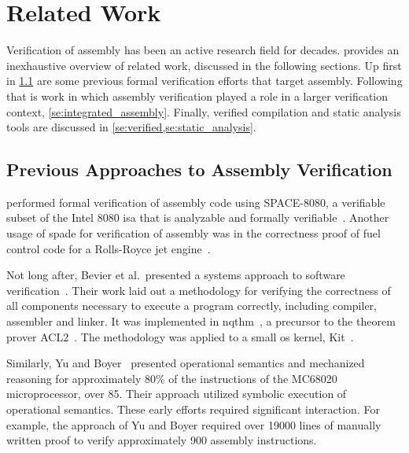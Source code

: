 \chapter{Related Work}

Verification of assembly has been an active research field for decades.
 provides an inexhaustive overview of related work,
discussed in the following sections.
Up first in \cref{se:previous_assembly}
are some previous formal verification efforts that target assembly.
Following that is work in which assembly verification played a role
in a larger verification context, \cref{se:integrated_assembly}.
Finally, verified compilation and static analysis tools are discussed
in \cref{se:verified,se:static_analysis}.

\section{Previous Approaches to Assembly Verification}\label{se:previous_assembly}
\citet{clutterbuck1988verification} performed formal verification
of assembly code using SPACE-8080, a verifiable subset of the Intel 8080
\ac{isa} that is analyzable and formally verifiable~\citep{carre1986spade}.
Another usage of \ac{spade} for verification of assembly
was in the correctness proof of fuel control code for a Rolls-Royce
jet engine~\citet{oneill1988verification}.

Not long after, Bevier et al.\ presented a systems approach
to software verification~\citep{bevier1989approach,boyer1979computational}.
Their work laid out a methodology for verifying the correctness
of all components necessary to execute a program correctly,
including compiler, assembler and linker.
It was implemented in \ac{nqthm}~\citep{boyer1979computational},
a precursor to the theorem prover ACL2~\citep{ACL2}.
The methodology was applied to a small \ac{os} kernel, Kit~\citep{bevier1989kit}.

Similarly, Yu and Boyer~\citep{yu1992automated,boyer1996automated}
presented operational semantics and mechanized reasoning
for approximately 80\% of the instructions of the MC68020 microprocessor,
over 85.
Their approach utilized symbolic execution of operational semantics.
These early efforts required significant interaction.
For example, the approach of Yu and Boyer required over \num{19000}
lines of manually written proof to verify approximately \num{900} assembly instructions.

